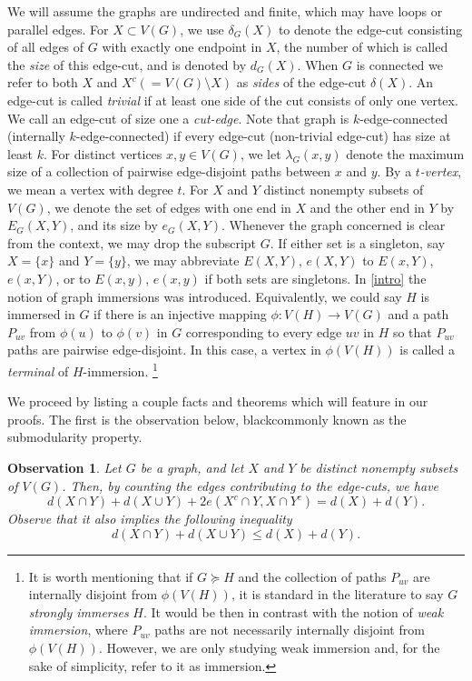 \documentclass[letterpaper,11pt]{article}
\newtheorem{observation}[theorem]{Observation}
\theoremstyle{definition}
\newcommand{\col}{black}
\begin{document}
We will assume the graphs are undirected and finite, which may have loops or parallel edges. For $X\subset V(G)$, we use $\delta_G(X)$ to denote the edge-cut consisting of all edges of $G$ with exactly one endpoint in $X$, the number of which is called the \emph{size} of this edge-cut, and is denoted by $d_G(X)$. When $G$ is connected we refer to both $X$ and $X^c (=V(G)\setminus X)$ as \emph{sides} of the edge-cut $\delta (X)$. An edge-cut is called \emph{trivial} if at least one side of the cut consists of only one vertex. We call an edge-cut of size one a \emph{cut-edge}. Note that graph is $k$-edge-connected (internally $k$-edge-connected) if every edge-cut (non-trivial edge-cut) has size at least $k$. For distinct vertices $x, y \in V(G)$, we let $\lambda_G({x,y})$ denote the maximum size of a collection of pairwise edge-disjoint paths between $x$ and $y$. By a \emph{$t$-vertex}, we mean a vertex with degree $t$. For $X$ and $Y$ distinct nonempty subsets of $V(G)$, we denote the set of edges with one end in $X$ and the other end in $Y$ by $E_G(X, Y)$, and its size by $e_G(X, Y)$. Whenever the graph concerned is clear from the context, we may drop the subscript $G$. If either set is a singleton, say \( X = \{x\} \) and \( Y = \{y\} \), we may abbreviate \( E(X, Y) \), \( e(X, Y) \) to \( E(x, Y) \), \( e(x, Y) \), or to \( E(x, y) \), \( e(x, y) \) if both sets are singletons. 
 In \cref{intro} the notion of graph immersions was introduced. Equivalently, we could say $H$ is immersed in $G$ if there is an injective mapping $\phi:V(H) \rightarrow V(G)$ and a path $P_{uv}$ from $\phi(u)$ to $\phi(v)$  in $G$ corresponding to every edge $uv$ in $H$ so that $P_{uv}$ paths are pairwise edge-disjoint. In this case, a vertex in $\phi(V(H))$ is called a \emph{terminal} of $H$-immersion. \footnote{It is worth mentioning that if $G\succeq H$ and the collection of paths $P_{uv}$ are internally disjoint from $\phi(V(H))$, it is standard in the literature to say $G$ \emph{strongly immerses} $H$. It would be then in contrast with the notion of \emph{weak immersion}, where $P_{uv}$ paths are not necessarily internally disjoint from $\phi(V(H))$. However, we are only studying weak immersion and, for the sake of simplicity, refer to it as immersion.}

We proceed by listing a couple facts and theorems which will feature in our proofs. The first is the observation below, {\color \col {commonly known as the submodularity property}}.


\begin{observation}
\label{cuts-edge-count}
Let $G$ be a graph, and let $X$ and $Y$ be distinct nonempty subsets of $V(G)$. Then, by counting the edges contributing to the edge-cuts, we have
$$d(X\cap Y)+d(X\cup Y)+2e(X^c\cap Y, X\cap Y^c)=d(X)+d(Y).$$
Observe that it also implies the following inequality $$d(X\cap Y)+d(X\cup Y)\le d(X)+d(Y).$$
\end{observation}
\end{document}
